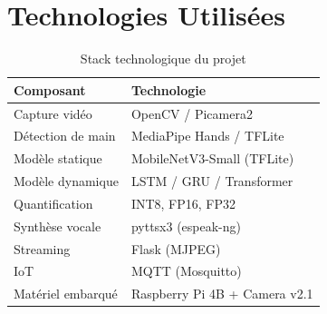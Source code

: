 \section{Technologies Utilisées}

\begin{table}[H]
    \centering
    \begin{tabular}{ll}
        \toprule
        \textbf{Composant} & \textbf{Technologie} \\
        \midrule
        Capture vidéo & OpenCV / Picamera2 \\
        Détection de main & MediaPipe Hands / TFLite \\
        Modèle statique & MobileNetV3-Small (TFLite) \\
        Modèle dynamique & LSTM / GRU / Transformer \\
        Quantification & INT8, FP16, FP32 \\
        Synthèse vocale & pyttsx3 (espeak-ng) \\
        Streaming & Flask (MJPEG) \\
        IoT & MQTT (Mosquitto) \\
        Matériel embarqué & Raspberry Pi 4B + Camera v2.1 \\
        \bottomrule
    \end{tabular}
    \caption{Stack technologique du projet}
\end{table}
